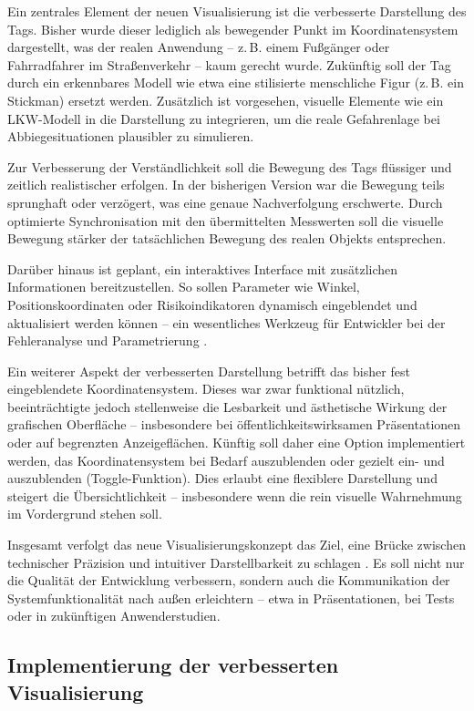 \documentclass[a4paper, 12pt]{article} %
\begin{document}
Ein zentrales Element der neuen Visualisierung ist die verbesserte Darstellung des Tags. Bisher wurde dieser lediglich als bewegender Punkt im 
Koordinatensystem dargestellt, was der realen Anwendung – z.\,B. einem Fußgänger oder Fahrradfahrer im Straßenverkehr – kaum gerecht wurde. Zukünftig 
soll der Tag durch ein erkennbares Modell wie etwa eine stilisierte menschliche Figur (z.\,B. ein Stickman) ersetzt werden. Zusätzlich ist vorgesehen,
visuelle Elemente wie ein \ac{LKW}-Modell in die Darstellung zu integrieren, um die reale Gefahrenlage bei Abbiegesituationen plausibler zu simulieren.

Zur Verbesserung der Verständlichkeit soll die Bewegung des Tags flüssiger und zeitlich realistischer erfolgen. In der bisherigen Version war die 
Bewegung teils sprunghaft oder verzögert, was eine genaue Nachverfolgung erschwerte. Durch optimierte Synchronisation mit 
den übermittelten Messwerten soll die visuelle Bewegung stärker der tatsächlichen Bewegung des realen Objekts entsprechen.

Darüber hinaus ist geplant, ein interaktives Interface mit zusätzlichen Informationen bereitzustellen. So sollen Parameter wie Winkel, 
Positionskoordinaten oder Risikoindikatoren dynamisch eingeblendet und aktualisiert werden können – ein wesentliches Werkzeug für Entwickler bei der Fehleranalyse und Parametrierung \cite{usercentered_visualization}.

Ein weiterer Aspekt der verbesserten Darstellung betrifft das bisher fest eingeblendete Koordinatensystem. Dieses war zwar funktional nützlich,
beeinträchtigte jedoch stellenweise die Lesbarkeit und ästhetische Wirkung der grafischen Oberfläche – insbesondere bei öffentlichkeitswirksamen 
Präsentationen oder auf begrenzten Anzeigeflächen. Künftig soll daher eine Option implementiert werden, das Koordinatensystem bei Bedarf auszublenden 
oder gezielt ein- und auszublenden (Toggle-Funktion). Dies erlaubt eine flexiblere Darstellung und steigert die Übersichtlichkeit – insbesondere wenn 
die rein visuelle Wahrnehmung im Vordergrund stehen soll.

Insgesamt verfolgt das neue Visualisierungskonzept das Ziel, eine Brücke zwischen technischer Präzision und intuitiver Darstellbarkeit zu schlagen \cite{usercentered_visualization}. 
Es soll nicht nur die Qualität der Entwicklung verbessern, sondern auch die Kommunikation der Systemfunktionalität nach außen erleichtern – etwa in 
Präsentationen, bei Tests oder in zukünftigen Anwenderstudien.

\subsection{Implementierung der verbesserten Visualisierung}
\end{document}
